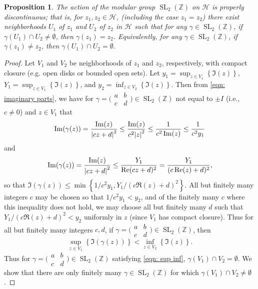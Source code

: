 \documentclass[10pt,leqno,twoside,b5paper]{article}
\theoremstyle{plain}
\newtheorem{proposition}[lem]{Proposition}
\theoremstyle{definition}
\numberwithin{equation}{section}
\numberwithin{lem}{section}
\newcommand{\cbr}[1]{\left\{#1\right\}}
\DeclareMathOperator{\SL}{SL}
\newcommand{\slz}{\SL_2(\mathbb{Z})}
\begin{document}
\begin{proposition}\label{prop: properly discontinuous}
    The action of the modular group $\slz$ on $\mathcal H$ is properly discontinuous; that is, for $z_1,z_2\in \mathcal H$, (including the case $z_1 = z_2$) there exist neighborhoods $U_1$ of $z_1$ and $U_2$ of $z_2$ in $\mathcal H$ such that for any $\gamma\in \slz$, if $\gamma(U_1)\cap U_2\neq \emptyset$, then $\gamma(z_1) = z_2$. Equivalently, for any $\gamma\in\slz$, if $\gamma(z_1)\neq z_2$, then $\gamma(U_1)\cap U_2= \emptyset$.
\end{proposition}
\begin{proof}
    Let $V_1$ and $V_2$ be neighborhoods of $z_1$ and $z_2$, respectively, with compact closure (e.g. open disks or bounded open sets). Let $y_1 = \sup_{z\in V_1}\cbr{\Im(z)}$, $Y_1 = \sup_{z\in V_1}\cbr{\Im(z)}$, and $y_2 = \inf_{z\in V_2}\cbr{\Im(z)}$. Then from \cref{eqn: imaginary parts}, we have for $\gamma = \big(\!\begin{smallmatrix}
        a & b \\ c & d
    \end{smallmatrix}\!\big)\in \slz$ not equal to $\pm I$ (i.e., $c\neq 0$) and $z\in V_1$ that \[\Im(\gamma(z)) = \frac{\Im(z)}{\abs{cz+d}^2}\leq \frac{\Im(z)}{c^2\abs{z}^2}\leq \frac{1}{c^2\Im(z)}\leq \frac{1}{c^2y_1}\] and \[\Im(\gamma(z)) = \frac{\Im(z)}{\abs{cz+d}^2}\leq \frac{Y_1}{\Re(cz+d)^2} = \frac{Y_1}{(c\Re(z)+d)^2},\] so that $\Im(\gamma(z))\leq\min\cbr{1/c^2y_1,Y_1/(c\Re(z)+d)^2}$. All but finitely many integers $c$ may be chosen so that $1/c^2y_1< y_2$, and of the finitely many $c$ where this inequality does not hold, we may choose all but finitely many $d$ such that $Y_1/(c\Re(z)+d)^2< y_2$ uniformly in $z$ (since $V_1$ has compact closure). Thus for all but finitely many integers $c,d$, if $\gamma  = \big(\!\begin{smallmatrix}
        a & b \\ c & d
    \end{smallmatrix}\!\big)\in \slz$, then \begin{equation}\label{eqn: sup inf}
        \sup_{z\in V_1}\cbr{\Im(\gamma(z))}< \inf_{z\in V_2}\cbr{\Im(z)}.
    \end{equation} Thus for $\gamma = \big(\!\begin{smallmatrix}
        a & b \\ c & d
    \end{smallmatrix}\!\big)\in \slz$ satisfying \cref{eqn: sup inf}, $\gamma(V_1)\cap V_2=\emptyset$. We show that there are only finitely many $\gamma\in \slz$ for which $\gamma(V_1)\cap V_2\neq\emptyset$.


\end{proof}
\end{document}
